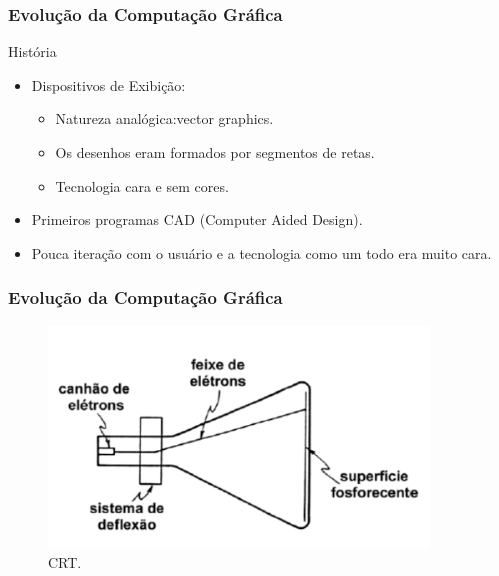 \documentclass{beamer}
\begin{document}
\begin{frame}
\frametitle{Evolução da Computação Gráfica}

\begin{block}{História}

	\begin{itemize}
		\item<1-> Dispositivos de Exibição:
		\begin{itemize}
			\item<1-> Natureza analógica:vector graphics.
			\item<1-> Os desenhos eram formados por segmentos de retas.
			\item<1-> Tecnologia cara e sem cores.
		\end{itemize}
		\item<1-> Primeiros programas CAD  (Computer Aided Design).
		\item<1-> Pouca iteração com o usuário e a tecnologia como um todo era muito cara.
	
	\end{itemize}
\end{block}

\end{frame}



\begin{frame}
\frametitle{Evolução da Computação Gráfica}

	\begin{figure}[!h]
		\begin{center}
			\includegraphics[width=0.9\textwidth]{Figures/crt}
			\caption{CRT.}
		\end{center}
		
	\end{figure}

\end{frame}
\end{document}
